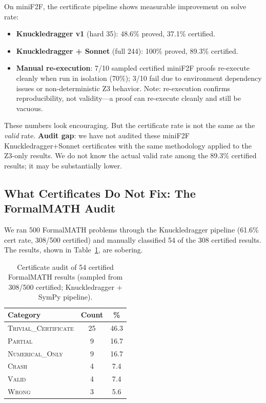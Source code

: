 \documentclass[11pt]{article}
\begin{document}
On miniF2F, the certificate pipeline shows measurable improvement on solve rate:

\begin{itemize}[leftmargin=*,itemsep=2pt]
    \item \textbf{Knuckledragger v1} (hard 35): 48.6\% proved, 37.1\% certified.
    \item \textbf{Knuckledragger + Sonnet} (full 244): 100\% proved, 89.3\% certified.
    \item \textbf{Manual re-execution}: 7/10 sampled certified miniF2F proofs re-execute cleanly when run in isolation (70\%); 3/10 fail due to environment dependency issues or non-deterministic Z3 behavior. Note: re-execution confirms reproducibility, not validity---a proof can re-execute cleanly and still be vacuous.
\end{itemize}

These numbers look encouraging. But the certificate rate is not the same as the \emph{valid} rate. \textbf{Audit gap}: we have not audited these miniF2F Knuckledragger+Sonnet certificates with the same methodology applied to the Z3-only results. We do not know the actual valid rate among the 89.3\% certified results; it may be substantially lower.

\subsection{What Certificates Do Not Fix: The FormalMATH Audit}

We ran 500 FormalMATH problems through the Knuckledragger pipeline (61.6\% cert rate, 308/500 certified) and manually classified 54 of the 308 certified results. The results, shown in Table~\ref{tab:formalmath}, are sobering.

\begin{table}[t]
\centering
\caption{Certificate audit of 54 certified FormalMATH results (sampled from 308/500 certified; Knuckledragger + SymPy pipeline).}
\label{tab:formalmath}
\small
\begin{tabular}{@{}lcc@{}}
\toprule
\textbf{Category} & \textbf{Count} & \textbf{\%} \\
\midrule
\textsc{Trivial\_Certificate} & 25 & 46.3 \\
\textsc{Partial} & 9 & 16.7 \\
\textsc{Numerical\_Only} & 9 & 16.7 \\
\textsc{Crash} & 4 & 7.4 \\
\textsc{Valid} & 4 & 7.4 \\
\textsc{Wrong} & 3 & 5.6 \\
\bottomrule
\end{tabular}
\end{table}
\end{document}
